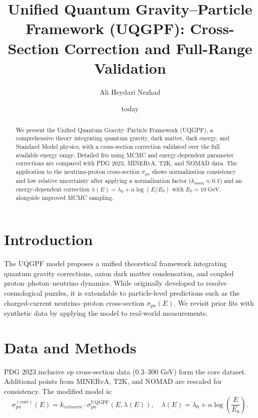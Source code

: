 \documentclass[aps,prd,superscriptaddress,showpacs,nofootinbib,twocolumn]{revtex4-2}
\begin{document}
	\title{Unified Quantum Gravity--Particle Framework (UQGPF): Cross-Section Correction and Full-Range Validation}
\author{Ali Heydari Nezhad}
\date{today}

\begin{abstract}
We present the Unified Quantum Gravity--Particle Framework (UQGPF), a comprehensive theory integrating quantum gravity, dark matter, dark energy, and Standard Model physics, with a cross-section correction validated over the full available energy range. Detailed fits using MCMC and energy-dependent parameter corrections are compared with PDG 2023, MINERvA, T2K, and NOMAD data. The application to the neutrino-proton cross-section $\sigma_{pn}$ shows normalization consistency and low relative uncertainty after applying a normalization factor ($k_{\text{norm}} \approx 0.1$) and an energy-dependent correction $\lambda(E) = \lambda_0 + \alpha \log(E/E_0)$ with $E_0 = 10~\mathrm{GeV}$, alongside improved MCMC sampling.
\end{abstract}

\maketitle

\section{Introduction}
The UQGPF model proposes a unified theoretical framework integrating quantum gravity corrections, axion dark matter condensation, and coupled proton--photon--neutrino dynamics. While originally developed to resolve cosmological puzzles, it is extendable to particle-level predictions such as the charged-current neutrino--proton cross-section $\sigma_{pn}(E)$. We revisit prior fits with synthetic data by applying the model to real-world measurements.

\section{Data and Methods}
PDG 2023 inclusive $\nu p$ cross-section data ($0.3$--$300$ GeV) form the core dataset. Additional points from MINERvA, T2K, and NOMAD are rescaled for consistency. The modified model is:
\begin{equation}
    \sigma_{pn}^{(\mathrm{corr})}(E)=k_{ext{norm}} \cdot \sigma_{pn}^{\mathrm{UQGPF}}(E,\lambda(E)), \quad
    \lambda(E)=\lambda_0+\alpha\log\left(\frac{E}{E_0}\right) .
\end{equation}
\end{document}
